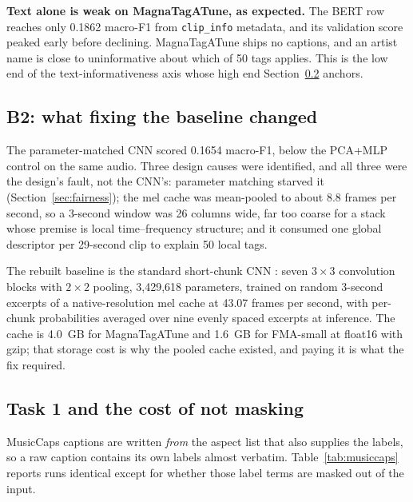 \documentclass[conference]{IEEEtran}
\newcommand{\BTwoTagParams}{3{,}429{,}618}
\newcommand{\TOneMtatF}{0.1862}
\begin{document}
\textbf{Text alone is weak on MagnaTagATune, as expected.} The BERT row reaches
only \TOneMtatF{} macro-F1 from \texttt{clip\_info} metadata, and its validation
score peaked early before declining. MagnaTagATune ships no captions, and an
artist name is close to uninformative about which of 50 tags applies. This is
the low end of the text-informativeness axis whose high end
Section~\ref{sec:leakage} anchors.

\subsection{B2: what fixing the baseline changed}
\label{sec:b2}
The parameter-matched CNN scored 0.1654 macro-F1, below the PCA+MLP control on
the same audio. Three design causes were identified, and all three were the
design's fault, not the CNN's: parameter matching starved it
(Section~\ref{sec:fairness}); the mel cache was mean-pooled to about 8.8 frames
per second, so a 3-second window was 26 columns wide, far too coarse for a stack
whose premise is local time--frequency structure; and it consumed one global
descriptor per 29-second clip to explain 50 local tags.

The rebuilt baseline is the standard short-chunk CNN \cite{won2020eval}: seven
$3{\times}3$ convolution blocks with $2{\times}2$ pooling, \BTwoTagParams{}
parameters, trained on random 3-second excerpts of a native-resolution mel cache
at 43.07 frames per second, with per-chunk probabilities averaged over nine
evenly spaced excerpts at inference. The cache is 4.0~GB for MagnaTagATune and
1.6~GB for FMA-small at float16 with gzip; that storage cost is why the pooled
cache existed, and paying it is what the fix required.

\subsection{Task 1 and the cost of not masking}
\label{sec:leakage}
MusicCaps captions are written \emph{from} the aspect list that also supplies
the labels, so a raw caption contains its own labels almost verbatim.
Table~\ref{tab:musiccaps} reports runs identical except for whether those label
terms are masked out of the input.
\end{document}
